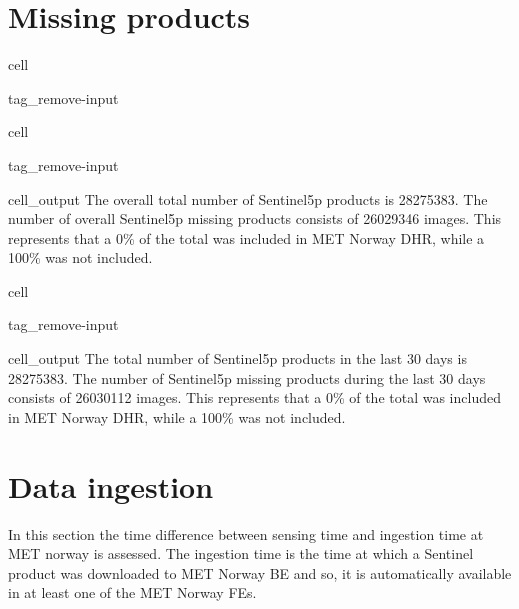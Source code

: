 \documentclass[letterpaper,10pt,english]{jupyterBook}
\begin{document}
\section{Missing products}
\label{\detokenize{S5p_portals:missing-products}}
\begin{sphinxuseclass}{cell}
\begin{sphinxuseclass}{tag_remove-input}
\end{sphinxuseclass}
\end{sphinxuseclass}
\begin{sphinxuseclass}{cell}
\begin{sphinxuseclass}{tag_remove-input}\begin{sphinxVerbatimOutput}

\begin{sphinxuseclass}{cell_output}
\sphinxAtStartPar
The overall total number of Sentinel\sphinxhyphen{}5p products is 28275383. The number of overall Sentinel\sphinxhyphen{}5p missing products consists of 26029346 images. This represents that a 0\% of the total was included in MET Norway DHR, while a 100\% was not included.

\end{sphinxuseclass}\end{sphinxVerbatimOutput}

\end{sphinxuseclass}
\end{sphinxuseclass}
\begin{sphinxuseclass}{cell}
\begin{sphinxuseclass}{tag_remove-input}\begin{sphinxVerbatimOutput}

\begin{sphinxuseclass}{cell_output}
\sphinxAtStartPar
The total number of Sentinel\sphinxhyphen{}5p products in the last 30 days is 28275383. The number of Sentinel\sphinxhyphen{}5p missing products during the last 30 days consists of 26030112 images. This represents that a 0\% of the total was included in MET Norway DHR, while a 100\% was not included.

\end{sphinxuseclass}\end{sphinxVerbatimOutput}

\end{sphinxuseclass}
\end{sphinxuseclass}

\section{Data ingestion}
\label{\detokenize{S5p_portals:data-ingestion}}
\sphinxAtStartPar
In this section the time difference between sensing time and ingestion time at MET norway is assessed. The ingestion time is the time at which a Sentinel product was downloaded to MET Norway BE and so, it is automatically available in at least one of the MET Norway FEs.
\end{document}

